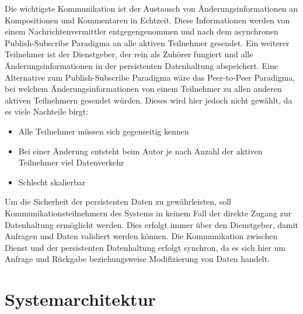 \documentclass[12pt]{scrartcl}
\begin{document}
Die wichtigste Kommunikation ist der Austausch von Änderungsinformationen an Kompositionen und Kommentaren in Echtzeit. Diese Informationen werden von einem Nachrichtenvermittler entgegengenommen und nach dem asynchronen Publish-Subscribe Paradigma an alle aktiven Teilnehmer gesendet. Ein weiterer Teilnehmer ist der Dienstgeber, der rein als Zuhörer fungiert und alle Änderungsinformationen in der persistenten Datenhaltung abspeichert. Eine Alternative zum Publish-Subscribe Paradigma wäre das Peer-to-Peer Paradigma, bei welchem Änderungsinformationen von einem Teilnehmer zu allen anderen aktiven Teilnehmern gesendet würden. Dieses wird hier jedoch nicht gewählt, da es viele Nachteile birgt:
\begin{itemize}
\item Alle Teilnehmer müssen sich gegenseitig kennen
\item Bei einer Änderung entsteht beim Autor je nach Anzahl der aktiven Teilnehmer viel Datenverkehr
\item Schlecht skalierbar
\end{itemize}

Um die Sicherheit der persistenten Daten zu gewährleisten, soll Kommunikationsteilnehmern des Systems in keinem Fall der direkte Zugang zur Datenhaltung ermöglicht werden. Dies erfolgt immer über den Dienstgeber, damit Anfragen und Daten validiert werden können. Die Kommunikation zwischen Dienst und der persistenten Datenhaltung erfolgt synchron, da es sich hier um Anfrage und Rückgabe beziehungsweise Modifizierung von Daten handelt.



\section{Systemarchitektur}



\end{document}
